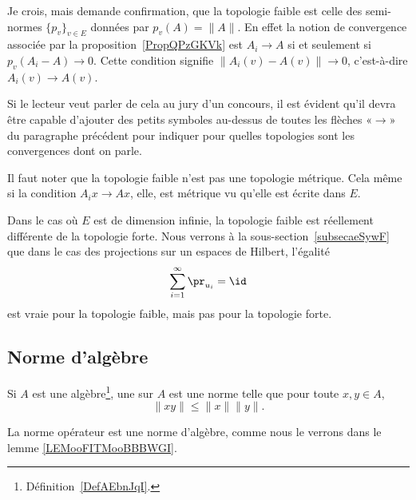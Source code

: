 \begin{probleme}
    Je crois, mais demande confirmation, que la topologie faible est celle des semi-normes \( \{ p_v \}_{v\in E}\) données par \( p_v(A)=\| A \|\). En effet la notion de convergence associée par la proposition~\ref{PropQPzGKVk} est \( A_i\to A\) si et seulement si \( p_v(A_i-A)\to 0\). Cette condition signifie \( \| A_i(v)-A(v) \|\to 0\), c'est-à-dire \( A_i(v)\to A(v)\).

    Si le lecteur veut parler de cela au jury d'un concours, il est évident qu'il devra être capable d'ajouter des petits symboles au-dessus de toutes les flèches «\( \to\)» du paragraphe précédent pour indiquer pour quelles topologies sont les convergences dont on parle.
\end{probleme}

\begin{remark}
    Il faut noter que la topologie faible n'est pas une topologie métrique. Cela même si la condition \( A_ix\to Ax\), elle, est métrique vu qu'elle est écrite dans \( E\).

    Dans le cas où \( E\) est de dimension infinie, la topologie faible est réellement différente de la topologie forte. Nous verrons à la sous-section~\ref{subsecaeSywF} que dans le cas des projections sur un espaces de Hilbert, l'égalité
    \begin{equation}
        \sum_{i=1}^{\infty}\pr_{u_i}=\id
    \end{equation}
    est vraie pour la topologie faible, mais pas pour la topologie forte.
\end{remark}

\subsection{Norme d'algèbre}

\begin{definition}  \label{DefJWRWQue}
    Si \( A\) est une algèbre\footnote{Définition~\ref{DefAEbnJqI}.}, une  sur \( A\) est une norme telle que pour toute \( x,y\in A\),
    \begin{equation}
        \| xy \|\leq \| x \|\| y \|.
    \end{equation}
\end{definition}
La norme opérateur est une norme d'algèbre, comme nous le verrons dans le lemme \ref{LEMooFITMooBBBWGI}.

